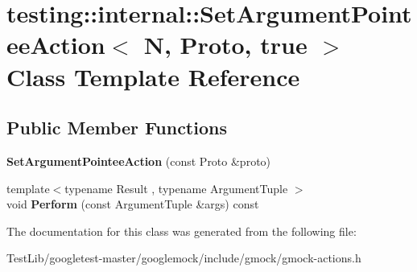 \hypertarget{classtesting_1_1internal_1_1SetArgumentPointeeAction_3_01N_00_01Proto_00_01true_01_4}{}\section{testing\+:\+:internal\+:\+:Set\+Argument\+Pointee\+Action$<$ N, Proto, true $>$ Class Template Reference}
\label{classtesting_1_1internal_1_1SetArgumentPointeeAction_3_01N_00_01Proto_00_01true_01_4}
\subsection*{Public Member Functions}
\begin{DoxyCompactItemize}
\item 
\mbox{\label{classtesting_1_1internal_1_1SetArgumentPointeeAction_3_01N_00_01Proto_00_01true_01_4_af08b3a61e483f704e93872987d30ade0}} 
{\bfseries Set\+Argument\+Pointee\+Action} (const Proto \&proto)
\item 
\mbox{\label{classtesting_1_1internal_1_1SetArgumentPointeeAction_3_01N_00_01Proto_00_01true_01_4_ac89fa5dde5d2683206a77d29630917cd}} 
{\footnotesize template$<$typename Result , typename Argument\+Tuple $>$ }\\void {\bfseries Perform} (const Argument\+Tuple \&args) const
\end{DoxyCompactItemize}


The documentation for this class was generated from the following file\+:\begin{DoxyCompactItemize}
\item 
Test\+Lib/googletest-\/master/googlemock/include/gmock/gmock-\/actions.\+h\end{DoxyCompactItemize}
